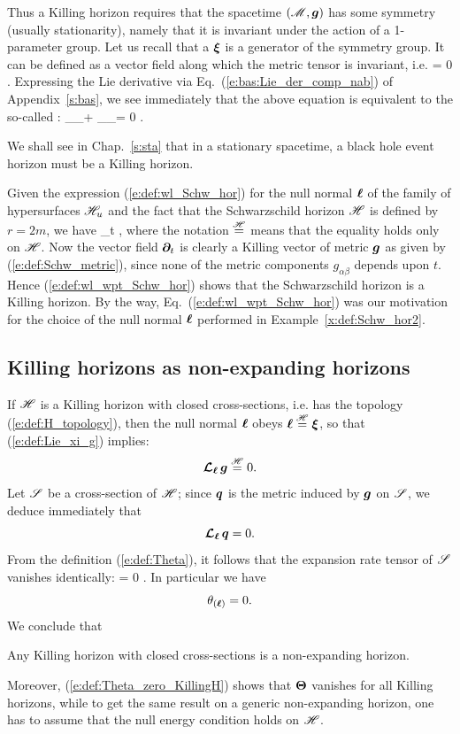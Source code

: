 {{Thus a Killing horizon requires that the spacetime $(\mathscr{M},\bm{g})$ has some symmetry
(usually stationarity), namely that it is invariant under the action of a 1-parameter group.
Let us recall that a 
$\bm{\xi}$ is a generator of the symmetry group. It can be defined as a vector
field along which the metric tensor is invariant, i.e.
\be \label{e:def:Lie_xi_g}
    \Lie{\xi}  = 0 .
\ee
Expressing the Lie derivative via Eq.~(\ref{e:bas:Lie_der_comp_nab}) of Appendix~\ref{s:bas},
we see immediately that the above equation is equivalent to the so-called
:
\be
    \nabla_\alpha \xi_\beta + \nabla_\beta \xi_\alpha = 0 .
\ee

We shall see in Chap.~\ref{s:sta} that in a stationary spacetime, a black hole
event horizon must be a Killing horizon.

\begin{example}
Given the expression (\ref{e:def:wl_Schw_hor}) for the null normal $\bm{\ell}$
of the family of hypersurfaces $\mathscr{H}_u$ and the fact that the Schwarzschild
horizon $\mathscr{H}$ is defined by $r=2m$, we have
\be \label{e:def:wl_wpt_Schw_hor}
    \wl \equalH \wpar_t ,
\ee
where the notation $\stackrel{\mathscr{H}}{=}$ means that the equality holds only on $\mathscr{H}$.
Now the vector field $\bm{\partial}_t$ is clearly a Killing vector of metric $\bm{g}$
as given by (\ref{e:def:Schw_metric}), since none of the metric components
$g_{\alpha\beta}$ depends upon $t$. Hence (\ref{e:def:wl_wpt_Schw_hor})
shows that the Schwarzschild horizon is a Killing horizon. By the way,
Eq.~(\ref{e:def:wl_wpt_Schw_hor}) was our motivation for the choice of the
null normal $\bm{\ell}$ performed in Example~\ref{x:def:Schw_hor2}.
\end{example}

\subsection{Killing horizons as non-expanding horizons}

If $\mathscr{H}$ is a Killing horizon with closed cross-sections, i.e. has the
topology (\ref{e:def:H_topology}), then the null normal $\bm{\ell}$ obeys $\bm{\ell} \stackrel{\mathscr{H}}{=} \bm{\xi}$,
so that (\ref{e:def:Lie_xi_g}) implies:
\[
    \bm{\mathcal{L}}_{\bm{\ell}}\, \bm{g} \stackrel{\mathscr{H}}{=} 0 .
\]
Let $\mathscr{S}$ be a cross-section of $\mathscr{H}$; since $\bm{q}$ is the metric induced by $\bm{g}$
on $\mathscr{S}$, we deduce immediately that
\[
    \bm{\mathcal{L}}_{\bm{\ell}}\, \bm{q} = 0 .
\]
From the definition (\ref{e:def:Theta}), it follows that the expansion rate
tensor of $\mathscr{S}$ vanishes identically:
\be \label{e:def:Theta_zero_KillingH}
    \w{\Theta} = 0 .
\ee
In particular we have
\[
    \theta_{(\bm{\ell})} = 0 .
\]
We conclude that
\begin{greybox}
Any Killing horizon with closed cross-sections is a non-expanding horizon.
\end{greybox}
Moreover, (\ref{e:def:Theta_zero_KillingH}) shows that $\bm{\Theta}$ vanishes
for all Killing horizons, while to get the same result on a generic non-expanding
horizon, one has to assume that the null energy condition holds on $\mathscr{H}$.

}}
